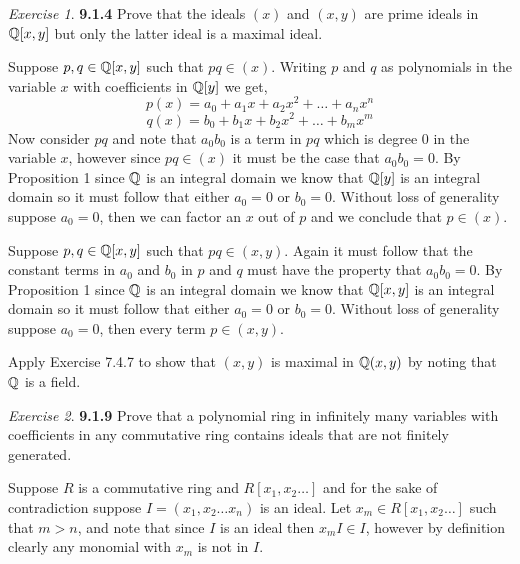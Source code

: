 \documentclass[12pt]{amsart}
\makeatletter
\theoremstyle{remark}
\newtheorem*{exercise}{Exercise}%
\def\QQ{{\ensuremath\mathbb Q}}
\renewenvironment{proof}[1][\proofname]{\par\doublespacing
  \pushQED{\qed}%
  \normalfont \topsep6\p@\@plus6\p@\relax
  \list{}{%
    \settowidth{\leftmargin}{\itshape\proofname:\hskip\labelsep}%
    \setlength{\labelwidth}{0pt}%
    \setlength{\itemindent}{-\leftmargin}%
  }%
  \item[\hskip\labelsep\itshape#1\@addpunct{:}]\ignorespaces
}{%
  \popQED\endlist\@endpefalse
  \singlespacing
}
\theoremstyle{mycomment}
\makeatother
\begin{document}
\begin{exercise}{\textbf{9.1.4}} Prove that the ideals $(x)$ and $(x, y)$ are prime ideals in $\QQ[x, y]$ but only the latter ideal is 
  a maximal ideal. 
  \begin{proof} Suppose $p, q \in \QQ[x, y]$ such that $pq \in (x)$. Writing $p$ and $q$ as polynomials in the variable $x$ with coefficients in $\QQ[y]$ 
    we get, 
    \begin{equation*}
      p(x) = a_0 + a_1x + a_2x^2 + \dots + a_nx^n
    \end{equation*} 
    \begin{equation*}
      q(x) = b_0 + b_1x + b_2x^2 + \dots + b_mx^m
    \end{equation*} 
    Now consider $pq$ and note that $a_0b_0$ is a term in $pq$ which is degree $0$ in the variable $x$, however since $pq \in (x)$ it 
    must be the case that $a_0b_0 = 0$. By Proposition 1 since $\QQ$ is an integral domain we know that $\QQ[y]$ is an integral domain so 
    it must follow that either $a_0 = 0$ or $b_0 = 0$. Without loss of generality suppose $a_0 = 0$, then 
    we can factor an $x$ out of $p$ and we conclude that $p \in (x)$.

    Suppose $p, q \in \QQ[x, y]$ such that $pq \in (x, y)$. Again it must follow that the constant terms in $a_0$ and $b_0$ in $p$ and $q$ must 
    have the property that $a_0b_0 = 0$. By Proposition 1 since $\QQ$ is an integral domain we know that $\QQ[x,y]$ is an integral domain so 
    it must follow that either $a_0 = 0$ or $b_0 = 0$. Without loss of generality suppose $a_0 = 0$, then every term $p \in (x, y)$. 

    Apply Exercise 7.4.7 to show that $(x, y)$ is maximal in $\QQ(x, y)$ by noting that $\QQ$ is a field.
  \end{proof}
\end{exercise}
\vspace{.5in}



\begin{exercise}{\textbf{9.1.9}} Prove that a polynomial ring in infinitely many variables with coefficients in any commutative ring contains ideals that are not finitely 
  generated.  
  \begin{proof}  Suppose $R$ is a commutative ring and $R[x_1, x_2 \dots]$ and for the sake of contradiction suppose $I = (x_1, x_2 \dots x_n)$ is an ideal. Let $x_m \in R[x_1, x_2 \dots]$ such that 
    $m > n$, and note that since $I$ is an ideal then $x_mI \in I$, however by definition clearly any monomial with $x_m$ is not in $I$. 

  \end{proof}
\end{exercise}
\vspace{.5in}
\end{document}
